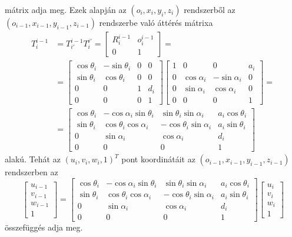 \documentclass[12pt,a4paper]{report}
\theoremstyle{remark}
\theoremstyle{definition}
\begin{document}
mátrix adja meg. Ezek alapján az $(o_i, x_i, y_i, z_i)$ rendszerből az $(o_{i-1}, x_{i-1}, y_{i-1}, z_{i-1})$ 
rendszerbe való áttérés mátrixa
\begin{equation}
\begin{aligned}
T^{i-1}_{i} &= T^{i-1}_{i'} T^{i'}_{i} = 
    \begin{bmatrix}
    R^{i-1}_{i} & o^{i-1}_{i} \\ 
    0 & 1
    \end{bmatrix} = \\
&= \begin{bmatrix}
    \cos \theta_i & -\sin \theta_i & 0 & 0 \\ 
    \sin \theta_i & \cos \theta_i & 0 & 0 \\ 
    0 & 0 & 1 & d_i \\ 
    0 & 0 & 0 & 1
    \end{bmatrix} 
    \begin{bmatrix}
    1 & 0 & 0 & a_i \\ 
    0 & \cos \alpha_i & -\sin \alpha_i & 0 \\ 
    0 & \sin \alpha_i & \cos \alpha_i & 0 \\ 
    0 & 0 & 0 & 1
    \end{bmatrix} = \\
&= \begin{bmatrix}
    \cos \theta_i  & -\cos \alpha_i \sin \theta_i & \sin \theta_i \sin \alpha_i & a_i \cos \theta_i \\ 
    \sin \theta_i & \cos \theta_i \cos \alpha_i & -\cos \theta_i \sin \alpha_i & a_i \sin \theta_i \\ 
    0 & \sin \alpha_i & \cos \alpha_i & d_i \\ 
    0 & 0 & 0 & 1
    \end{bmatrix}
\end{aligned}
\end{equation}
alakú. Tehát az $(u_i, v_i, w_i, 1)^T$ pont koordinátáit az $(o_{i-1}, x_{i-1}, y_{i-1}, z_{i-1})$ rendszerben az
\begin{equation}
\begin{bmatrix}
u_{i-1} \\ 
v_{i-1} \\ 
w_{i-1} \\ 
1
\end{bmatrix} =
\begin{bmatrix}
\cos \theta_i  & -\cos \alpha_i \sin \theta_i & \sin \theta_i \sin \alpha_i & a_i \cos \theta_i \\ 
\sin \theta_i & \cos \theta_i \cos \alpha_i & -\cos \theta_i \sin \alpha_i & a_i \sin \theta_i \\ 
0 & \sin \alpha_i & \cos \alpha_i & d_i \\ 
0 & 0 & 0 & 1
\end{bmatrix} 
\begin{bmatrix}
u_i \\ 
v_i \\ 
w_i \\ 
1
\end{bmatrix}
\end{equation}
összefüggés adja meg.
\end{document}
